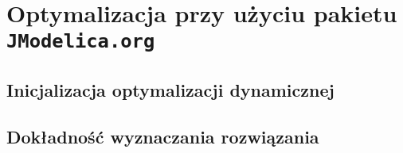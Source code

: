 \section{Optymalizacja przy użyciu pakietu \texttt{JModelica.org}}
\label{sec:opt}


\subsection{Inicjalizacja optymalizacji dynamicznej}
\label{sub:opt-init}


\subsection{Dokładność wyznaczania rozwiązania}
\label{sub:opt-dokladnosc}

